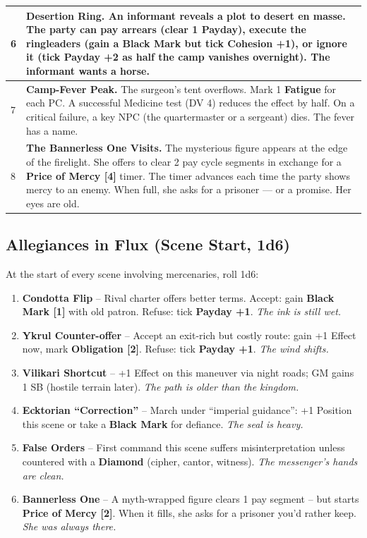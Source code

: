 \begin{longtable}{|p{}|p{}|}
\hline
6 & \textbf{Desertion Ring.} An informant reveals a plot to desert en masse. The party can pay arrears (clear 1 Payday), execute the ringleaders (gain a \textbf{Black Mark} but tick \textbf{Cohesion +1}), or ignore it (tick \textbf{Payday +2} as half the camp vanishes overnight). The informant wants a horse. \\
\hline
7 & \textbf{Camp-Fever Peak.} The surgeon's tent overflows. Mark 1 \textbf{Fatigue} for each PC. A successful Medicine test (DV 4) reduces the effect by half. On a critical failure, a key NPC (the quartermaster or a sergeant) dies. The fever has a name. \\
\hline
8 & \textbf{The Bannerless One Visits.} The mysterious figure appears at the edge of the firelight. She offers to clear 2 pay cycle segments in exchange for a \textbf{Price of Mercy [4]} timer. The timer advances each time the party shows mercy to an enemy. When full, she asks for a prisoner --- or a promise. Her eyes are old. \\
\hline
\end{longtable}

\subsection*{Allegiances in Flux (Scene Start, 1d6)}

At the start of every scene involving mercenaries, roll 1d6:

\begin{enumerate}[leftmargin=*]
    \item \textbf{Condotta Flip} -- Rival charter offers better terms. Accept: gain \textbf{Black Mark [1]} with old patron. Refuse: tick \textbf{Payday +1}. \textit{The ink is still wet.}
    \item \textbf{Ykrul Counter-offer} -- Accept an exit-rich but costly route: gain +1 Effect now, mark \textbf{Obligation [2]}. Refuse: tick \textbf{Payday +1}. \textit{The wind shifts.}
    \item \textbf{Vilikari Shortcut} -- +1 Effect on this maneuver via night roads; GM gains 1 SB (hostile terrain later). \textit{The path is older than the kingdom.}
    \item \textbf{Ecktorian ``Correction''} -- March under ``imperial guidance'': +1 Position this scene or take a \textbf{Black Mark} for defiance. \textit{The seal is heavy.}
    \item \textbf{False Orders} -- First command this scene suffers misinterpretation unless countered with a \textbf{Diamond} (cipher, cantor, witness). \textit{The messenger's hands are clean.}
    \item \textbf{Bannerless One} -- A myth-wrapped figure clears 1 pay segment -- but starts \textbf{Price of Mercy [2]}. When it fills, she asks for a prisoner you'd rather keep. \textit{She was always there.}
\end{enumerate}

